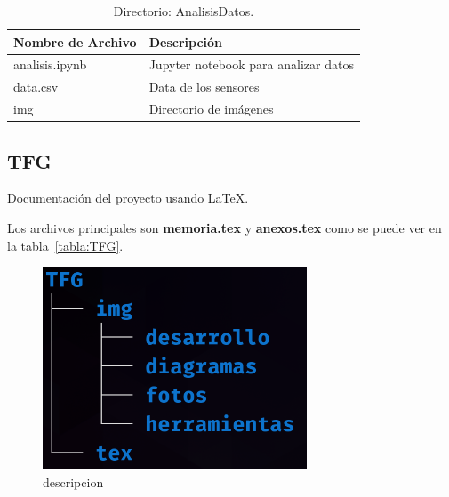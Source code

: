 
\begin{table}[htbp]
\begin{center}
\caption{Directorio: AnalisisDatos.}
\begin{tabular}{|l|l|} %
\hline
\rowcolor[HTML]{C0C0C0} 
\textbf{Nombre de Archivo} & \textbf{Descripción}\\ \hline
analisis.ipynb & Jupyter notebook para analizar datos\\ \hline
data.csv & Data de los sensores\\ \hline
img & Directorio de imágenes \\ \hline
\end{tabular}
\label{tabla:directorioAnalisisDatos}
\end{center}
\end{table}


\subsection{TFG}
Documentación del proyecto usando \LaTeX.

Los archivos principales son \textbf{memoria.tex} y \textbf{anexos.tex} como se puede ver en la tabla~\ref{tabla:TFG}.

\begin{figure}[h]
\centering
\includegraphics[width=0.7\textwidth]{img/diagramas/directorios_TFG.png}
\caption{descripcion}
\end{figure}

